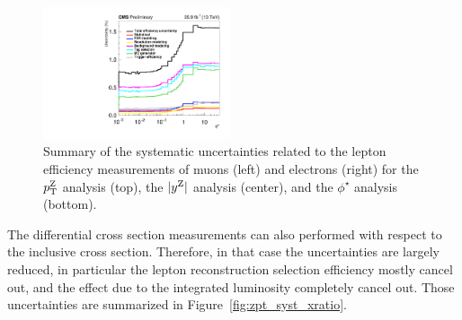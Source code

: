 \begin{figure}
        \includegraphics[width=0.49\textwidth]{figures/zpt/histoUnfoldingSystEffPhiStar_nsel1_dy3.pdf}
	\caption{Summary of the systematic uncertainties related to the lepton efficiency measurements of muons (left) and electrons (right) 
	for the $p_{\mathrm{T}}^{\mathrm{Z}}$ analysis (top), the $|y^{\mathrm{Z}}|$ analysis (center), and the $\phi^\star$ analysis (bottom).}
	\label{fig:zpt_systeff}
\end{figure}

The differential cross section measurements can also performed with respect to 
the inclusive cross section. Therefore, in that case the uncertainties are 
largely reduced, in particular the lepton reconstruction selection 
efficiency mostly cancel out, and the effect due to the integrated luminosity 
completely cancel out. Those uncertainties are summarized in Figure~\ref{fig:zpt_syst_xratio}.

